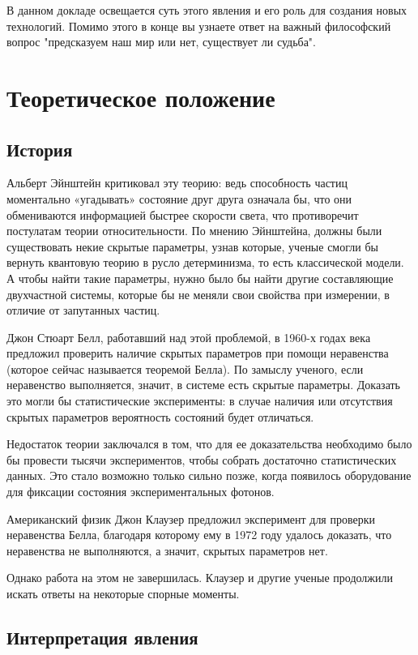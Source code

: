 \documentclass[a4paper, 12pt]{article}%
\begin{document}
В данном докладе освещается суть этого явления и его роль для создания новых технологий.
Помимо этого в конце вы узнаете ответ на важный философский вопрос "предсказуем наш мир или нет, существует ли судьба".

\section{Теоретическое положение}
 
\subsection{История}

Альберт Эйнштейн критиковал эту теорию: ведь способность частиц моментально «угадывать» состояние друг друга означала бы, что они обмениваются информацией быстрее скорости света, что противоречит постулатам теории относительности. По мнению Эйнштейна, должны были существовать некие скрытые параметры, узнав которые, ученые смогли бы вернуть квантовую теорию в русло детерминизма, то есть классической модели. А чтобы найти такие параметры, нужно было бы найти другие составляющие двухчастной системы, которые бы не меняли свои свойства при измерении, в отличие от запутанных частиц.

Джон Стюарт Белл, работавший над этой проблемой, в 1960-х годах века предложил проверить наличие скрытых параметров при помощи неравенства (которое сейчас называется теоремой Белла). По замыслу ученого, если неравенство выполняется, значит, в системе есть скрытые параметры. Доказать это могли бы статистические эксперименты: в случае наличия или отсутствия скрытых параметров вероятность состояний будет отличаться.

Недостаток теории заключался в том, что для ее доказательства необходимо было бы провести тысячи экспериментов, чтобы собрать достаточно статистических данных. Это стало возможно только сильно позже, когда появилось оборудование для фиксации состояния экспериментальных фотонов.

Американский физик Джон Клаузер предложил эксперимент для проверки неравенства Белла, благодаря которому ему в 1972 году удалось доказать, что неравенства не выполняются, а значит, скрытых параметров нет.

Однако работа на этом не завершилась. Клаузер и другие ученые продолжили искать ответы на некоторые спорные моменты.

\subsection{Интерпретация явления}
\end{document}

